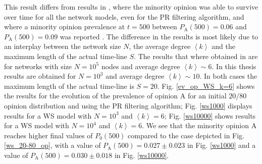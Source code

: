 \documentclass[11 pt , letterpaper , twoside , openright]{book}
\begin{document}
This result differs from results in \cite{Perra2019}, where the minority opinion was able to survive over time for all the network models, even for the PR filtering algorithm, and where a minority opinion prevalence at $t=500$ between $P_\text{A}(500) = 0.06$ and $P_\text{A}(500) = 0.09$ was reported \cite{Perra2019}. The difference in the results is most likely due to an interplay between the network size $N$, the average degree $\left<k\right>$ and the maximum length of the actual time-line $S$. The results that where obtained in \cite{Perra2019} are for networks with size $N = 10^5$ nodes and average degree $\left<k\right> \sim 6$. In this thesis results are obtained for $N=10^3$ and average degree $\left<k\right> \sim 10$. In both cases the maximum length of the actual time-line is $S=20$. Fig. \ref{ev_op_WS_k=6} shows the results for the evolution of the prevalence of opinion A for an initial $20/80$ opinion distribution and using the PR filtering algorithm; Fig. \ref{ws1000} displays results for a WS model with $N=10^3$ and $\left<k\right> = 6$; Fig. \ref{ws10000} shows results for a WS model with $N=10^4$ and $\left<k\right> = 6$. We see that the minority opinion A reaches higher final values of $P_0(500)$ compared to the case depicted in Fig. \ref{ws_20-80_op}, with a value of $P_\text{A}(500) = 0.027 \pm 0.023$ in Fig. \ref{ws1000} and a value of $P_\text{A}(500) = 0.030 \pm 0.018$ in Fig. \ref{ws10000}.
\end{document}
